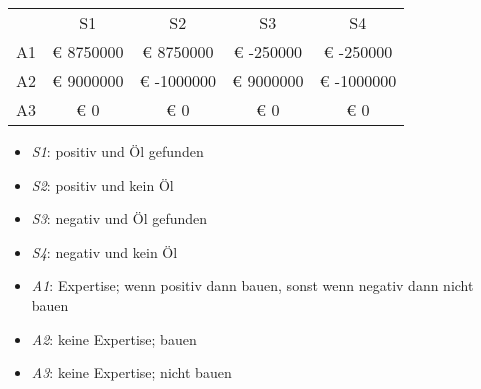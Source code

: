 \begin{tabular}{c|c|c|c|c|}
\multicolumn{1}{c}{}  & \multicolumn{1}{c}{S1}  & \multicolumn{1}{c}{S2}  & \multicolumn{1}{c}{S3}  & \multicolumn{1}{c}{S4} \\ \cline{2-5}
 A1 & € 8750000 & € 8750000 & € -250000 & € -250000 \\ \cline{2-5}
 A2 & € 9000000 & € -1000000 & € 9000000 & € -1000000 \\ \cline{2-5}
 A3 & € 0 & € 0 & € 0 & € 0 \\ \cline{2-5}
\end{tabular}
\begin{itemize}
\item {\em S1}: positiv und Öl gefunden
\item {\em S2}: positiv und kein Öl
\item {\em S3}: negativ und Öl gefunden
\item {\em S4}: negativ und kein Öl
\end{itemize}
\begin{itemize}
\item {\em A1}: Expertise;  wenn positiv dann bauen,  sonst wenn negativ dann nicht bauen
\item {\em A2}: keine Expertise; bauen
\item {\em A3}: keine Expertise; nicht bauen
\end{itemize}
